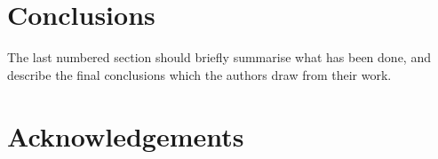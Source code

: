 \documentclass[a4paper,fleqn,usenatbib]{mnras}
\begin{document}
\section{Conclusions}

The last numbered section should briefly summarise what has been done, and describe
the final conclusions which the authors draw from their work.

\section*{Acknowledgements}









\end{document}
